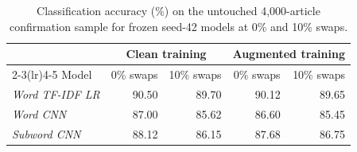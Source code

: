 \begin{table}[H]\centering\normalsize
\begin{tabular}{lrrrr}\toprule
 & \multicolumn{2}{c}{Clean training} & \multicolumn{2}{c}{Augmented training} \\
\cmidrule(lr){2-3}\cmidrule(lr){4-5}
Model & 0\% swaps & 10\% swaps & 0\% swaps & 10\% swaps \\\midrule
\textit{Word TF-IDF LR} & 90.50 & 89.70 & 90.12 & 89.65 \\
\textit{Word CNN} & 87.00 & 85.62 & 86.60 & 85.45 \\
\textit{Subword CNN} & 88.12 & 86.15 & 87.68 & 86.75 \\
\bottomrule
\end{tabular}
\caption[Confirmation set accuracy]{Classification accuracy (\%) on the untouched 4,000-article confirmation sample for frozen seed-42 models at 0\% and 10\% swaps.}\label{tab:held-out-review}
\end{table}
